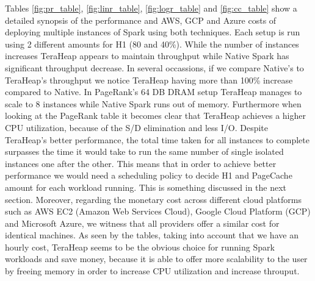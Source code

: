 Tables \ref{fig:pr_table}, \ref{fig:linr_table}, \ref{fig:logr_table}
and \ref{fig:cc_table} show a detailed synopsis of the performance and
AWS, GCP and Azure costs of deploying multiple instances of Spark
using both techniques. Each setup is run using 2 different amounts for
H1 (80 and 40\%). While the number of instances increases TeraHeap
appears to maintain throughput while Native Spark has significant
throughput decrease. In several occassions, if we compare Native's to
TeraHeap's throughput we notice TeraHeap having more than 100\%
increase compared to Native. In PageRank's 64 DB DRAM setup TeraHeap
manages to scale to 8 instances while Native Spark runs out of memory.
Furthermore when looking at the PageRank table it becomes clear that
TeraHeap achieves a higher CPU utilization, because of the S/D
elimination and less I/O. Despite TeraHeap's better performance, the
total time taken for all instances to complete surpasses the time it
would take to run the same number of single isolated instances one
after the other. This means that in order to achieve better
performance we would need a scheduling policy to decide H1 and
PageCache amount for each workload running. This is something
discussed in the next section. Moreover, regarding the monetary cost
across different cloud platforms such as AWS EC2 (Amazon Web Services
Cloud), Google Cloud Platform (GCP) and Microsoft Azure, we witness
that all providers offer a similar cost for identical machines. As
seen by the tables, taking into account that we have an hourly cost,
TeraHeap seems to be the obvious choice for running Spark workloads
and save money, because it is able to offer more scalability to the
user by freeing memory in order to increase CPU utilization and
increase throuput. 
